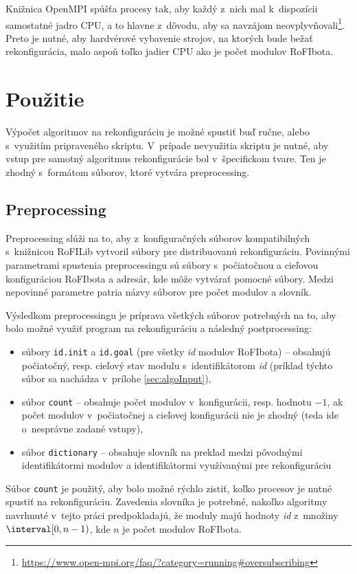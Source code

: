 \documentclass[
  printed, %
  oneside, %
  notable,   %
  nolof,     %
  nolot,     %
]{fithesis3}
\begin{document}
Knižnica OpenMPI spúšťa procesy tak, aby každý z~nich mal k~dispozícii samostatné jadro CPU, a to hlavne z~dôvodu, aby sa navzájom neovplyvňovali\footnote{\url{https://www.open-mpi.org/faq/?category=running\#oversubscribing}}. Preto je nutné, aby hardvérové vybavenie strojov, na ktorých bude bežať rekonfigurácia, malo aspoň toľko jadier CPU ako je počet modulov RoFIbota. 

\section{Použitie}
Výpočet algoritmov na rekonfiguráciu je možné spustiť buď ručne, alebo s~využitím pripraveného skriptu. V~prípade nevyužitia skriptu je nutné, aby vstup pre samotný algoritmus rekonfigurácie bol v~špecifickom tvare. Ten je zhodný s~formátom súborov, ktoré vytvára preprocessing.

\subsection{Preprocessing}
Preprocessing slúži na to, aby z~konfiguračných súborov kompatibilných s~knižnicou RoFILib vytvoril súbory pre distribuovanú rekonfiguráciu. Povinnými parametrami spustenia preprocessingu sú súbory s~počiatočnou a cieľovou konfiguráciou RoFIbota a adresár, kde môže vytvárať pomocné súbory. Medzi nepovinné parametre patria názvy súborov pre počet modulov a slovník. 

Výsledkom preprocessingu je príprava všetkých súborov potrebných na to, aby bolo možné využiť program na rekonfiguráciu a následný postprocessing: 
\begin{itemize}
    \item súbory \texttt{id.init} a \texttt{id.goal} (pre všetky \textit{id} modulov RoFIbota) -- obsahujú počiatočný, resp. cieľový stav modulu s~identifikátorom \textit{id} (príklad týchto súbor sa nachádza v~prílohe \ref{sec:algoInput}), 
    \item súbor \texttt{count} -- obsahuje počet modulov v~konfigurácii, resp. hodnotu $-1$, ak počet modulov v~počiatočnej a cieľovej konfigurácii nie je zhodný (teda ide o~nesprávne zadané vstupy), 
    \item súbor \texttt{dictionary} -- obsahuje slovník na preklad medzi pôvodnými identifikátormi modulov a identifikátormi využívanými pre rekonfiguráciu
\end{itemize}

Súbor \texttt{count} je použitý, aby bolo možné rýchlo zistiť, koľko procesov je nutné spustiť na rekonfiguráciu. Zavedenia slovníka je potrebné, nakoľko algoritmy navrhnuté v~tejto práci predpokladajú, že moduly majú hodnoty \textit{id} z~množiny $\interval[0, n - 1)$, kde $n$ je počet modulov RoFIbota.
\end{document}
